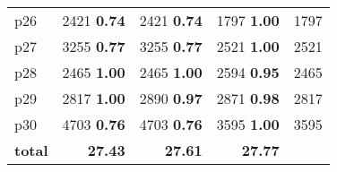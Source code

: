 \begin{tabular}{lrrrr}
\multicolumn{1}{l|}{p26} & {\footnotesize 2421} \textbf{0.74} & {\footnotesize 2421} \textbf{0.74} & {\footnotesize 1797} \textbf{1.00} & \multicolumn{1}{|r}{1797}\\
\multicolumn{1}{l|}{p27} & {\footnotesize 3255} \textbf{0.77} & {\footnotesize 3255} \textbf{0.77} & {\footnotesize 2521} \textbf{1.00} & \multicolumn{1}{|r}{2521}\\
\multicolumn{1}{l|}{p28} & {\footnotesize 2465} \textbf{1.00} & {\footnotesize 2465} \textbf{1.00} & {\footnotesize 2594} \textbf{0.95} & \multicolumn{1}{|r}{2465}\\
\multicolumn{1}{l|}{p29} & {\footnotesize 2817} \textbf{1.00} & {\footnotesize 2890} \textbf{0.97} & {\footnotesize 2871} \textbf{0.98} & \multicolumn{1}{|r}{2817}\\
\multicolumn{1}{l|}{p30} & {\footnotesize 4703} \textbf{0.76} & {\footnotesize 4703} \textbf{0.76} & {\footnotesize 3595} \textbf{1.00} & \multicolumn{1}{|r}{3595}\\
\midrule
\textbf{total} & \textbf{27.43} & \textbf{27.61} & \textbf{27.77} & \\
\bottomrule
\end{tabular}

